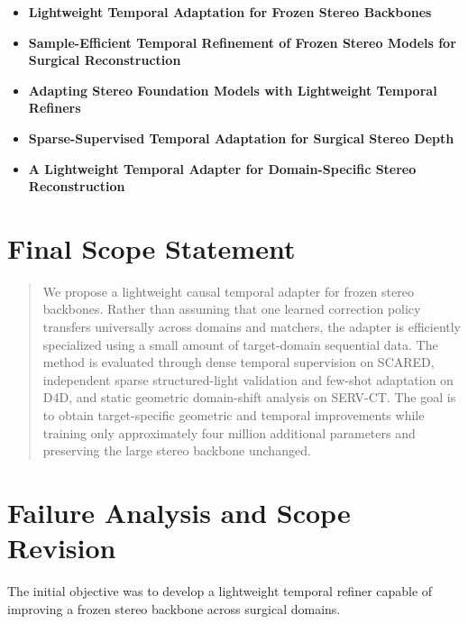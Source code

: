 \documentclass[11pt,a4paper]{article}
\begin{document}
\begin{itemize}[leftmargin=*]
    \item \textbf{Lightweight Temporal Adaptation for Frozen Stereo Backbones}

    \item \textbf{Sample-Efficient Temporal Refinement of Frozen Stereo Models
    for Surgical Reconstruction}

    \item \textbf{Adapting Stereo Foundation Models with Lightweight Temporal
    Refiners}

    \item \textbf{Sparse-Supervised Temporal Adaptation for Surgical Stereo Depth}

    \item \textbf{A Lightweight Temporal Adapter for Domain-Specific Stereo
    Reconstruction}
\end{itemize}

\section{Final Scope Statement}

\begin{quote}
We propose a lightweight causal temporal adapter for frozen stereo backbones.
Rather than assuming that one learned correction policy transfers universally
across domains and matchers, the adapter is efficiently specialized using a small
amount of target-domain sequential data. The method is evaluated through dense
temporal supervision on SCARED, independent sparse structured-light validation and
few-shot adaptation on D4D, and static geometric domain-shift analysis on SERV-CT.
The goal is to obtain target-specific geometric and temporal improvements while
training only approximately four million additional parameters and preserving the
large stereo backbone unchanged.
\end{quote}


\section{Failure Analysis and Scope Revision}

The initial objective was to develop a lightweight temporal refiner capable of
improving a frozen stereo backbone across surgical domains.
\end{document}
